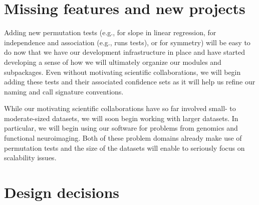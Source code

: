 %
%
%
%
%
%
%
%
%
%
%
%
%
%
%
%

\section{Missing features and new projects}


Adding new permutation tests (e.g., for slope in linear regression, for
independence and association (e.g., runs tests), or for symmetry) will be easy to
do now that we have our development infrastructure in place and have started
developing a sense of how we will ultimately organize our modules and
subpackages.  Even without motivating scientific collaborations, we will begin
adding these tests and their associated confidence sets as it will help us
refine our naming and call signature conventions.

While our motivating scientific collaborations have so far involved small- to
moderate-sized datasets, we will soon begin working with larger datasets.  In
particular, we will begin using our software for problems from
genomics and functional neuroimaging.  Both of these problem domains already
make use of permutation tests and the size of the datasets will enable to
seriously focus on scalability issues.

\section{Design decisions}

